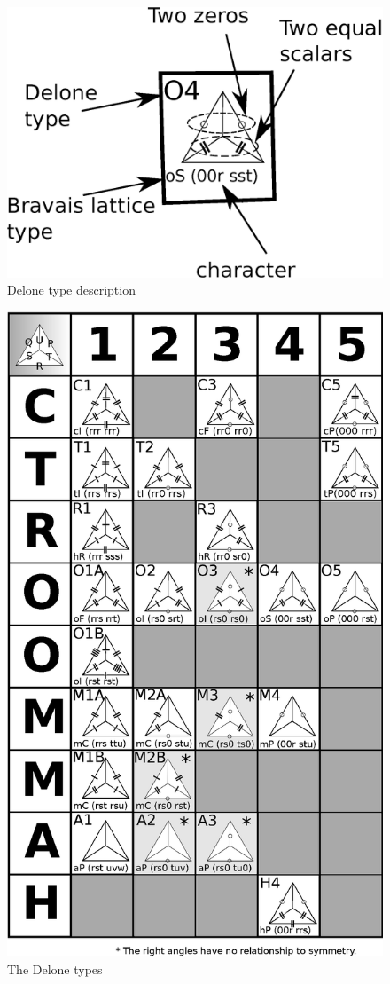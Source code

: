 \documentclass[preprint]{iucr}              %
\begin{document}
\begin{figure}
	\caption{Delone type description}
	\label{fig:terminology}
	\includegraphics[width=12cm]{terminology}
\end{figure}

\begin{figure}
	\caption{The Delone types}
	\label{fig:DeloneTypes}
	\includegraphics[width=12cm]{DeloneTypesGrid_2}
\end{figure}
\end{document}
